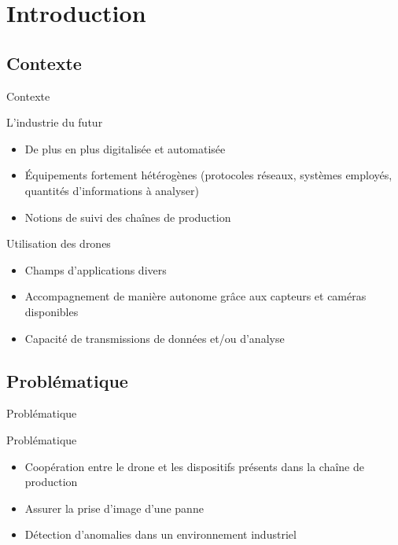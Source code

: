 \section*{Introduction}
    \subsection*{Contexte}
        \begin{frame}[allowframebreaks]{Contexte}
    		\begin{exampleblock}{L'industrie du futur}
    				\begin{itemize}
    					\item De plus en plus digitalisée et automatisée
    					\item Équipements fortement hétérogènes (protocoles réseaux, systèmes employés, quantités d'informations à analyser)
    					\item Notions de suivi des chaînes de production
    				\end{itemize}
    		\end{exampleblock}
    		
    		\begin{exampleblock}{Utilisation des drones}
    				\begin{itemize}
    					\item Champs d'applications divers
    					\item Accompagnement de manière autonome grâce aux capteurs et caméras disponibles
    					\item Capacité de transmissions de données et/ou d'analyse
    				\end{itemize}
    		\end{exampleblock}
        \end{frame}
%
    \subsection*{Problématique}
        \begin{frame}[allowframebreaks]{Problématique}
            \begin{exampleblock}{Problématique}
    			\begin{itemize}
    				\item Coopération entre le drone et les dispositifs présents dans la chaîne de production
    				\item Assurer la prise d'image d'une panne
    				\item Détection d'anomalies dans un environnement industriel
    			\end{itemize}
    		\end{exampleblock}
        \end{frame}
%
